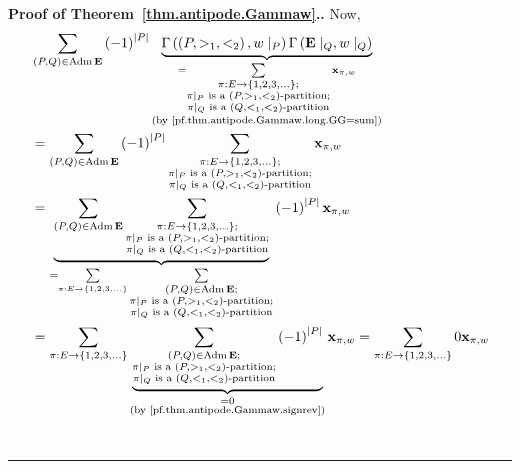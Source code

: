 \documentclass[numbers=enddot,12pt,final,onecolumn,notitlepage,abstracton]{scrartcl}
\theoremstyle{definition}
\newenvironment{proof}[1][Proof]{\noindent\textbf{#1.} }{\ \rule{0.5em}{0.5em}}
\let\sumnonlimits\sum
\renewcommand{\sum}{\sumnonlimits\limits}
\newenvironment{verlong}{}{}
\newcommand{\xx}{{\mathbf{x}}}
\newcommand{\Adm}{\operatorname{Adm}}
\newcommand{\EE}{{\mathbf{E}}}
\begin{document}
\begin{proof}[Proof of Theorem~\ref{thm.antipode.Gammaw}.]
\begin{verlong}
Now,
\begin{align*}
& \sum_{\left(P, Q\right) \in \Adm \EE}
\left(-1\right)^{\left|P\right|}
\underbrace{\Gamma\left(\left(P, >_1, <_2\right), w\mid_P\right)
            \Gamma\left(\EE\mid_Q, w\mid_Q\right)}_{
 \substack{ = \sum_{\substack{\pi : E \to \left\{1, 2, 3, \ldots\right\}; \\
                \pi\mid_P \text{ is a }\left(P, >_1, <_2\right)\text{-partition;} \\
                \pi\mid_Q \text{ is a }\left(Q, <_1, <_2\right)\text{-partition}}}
              \xx_{\pi, w} \\
            \text{(by \eqref{pf.thm.antipode.Gammaw.long.GG=sum})}}}
\\
& = \sum_{\left(P, Q\right) \in \Adm \EE}
\left(-1\right)^{\left|P\right|}
\sum_{\substack{\pi : E \to \left\{1, 2, 3, \ldots\right\}; \\
                \pi\mid_P \text{ is a }\left(P, >_1, <_2\right)\text{-partition;} \\
                \pi\mid_Q \text{ is a }\left(Q, <_1, <_2\right)\text{-partition}}}
\xx_{\pi, w} \\
& =
\underbrace{\sum_{\left(P, Q\right) \in \Adm \EE}
\sum_{\substack{\pi : E \to \left\{1, 2, 3, \ldots\right\}; \\
                \pi\mid_P \text{ is a }\left(P, >_1, <_2\right)\text{-partition;} \\
                \pi\mid_Q \text{ is a }\left(Q, <_1, <_2\right)\text{-partition}}}
}_{ =
\sum_{\pi : E \to \left\{1, 2, 3, \ldots\right\}}
\sum_{\substack{\left(P, Q\right) \in \Adm \EE ; \\
                \pi\mid_P \text{ is a }\left(P, >_1, <_2\right)\text{-partition;} \\
                \pi\mid_Q \text{ is a }\left(Q, <_1, <_2\right)\text{-partition}}}
}
\left(-1\right)^{\left|P\right|}
\xx_{\pi, w} \\
& = \sum_{\pi : E \to \left\{1, 2, 3, \ldots\right\}}
\underbrace{
\sum_{\substack{\left(P, Q\right) \in \Adm \EE ; \\
                \pi\mid_P \text{ is a }\left(P, >_1, <_2\right)\text{-partition;} \\
                \pi\mid_Q \text{ is a }\left(Q, <_1, <_2\right)\text{-partition}}}
\left(-1\right)^{\left|P\right|}
}
_{\substack{=0 \\
            \text{(by \eqref{pf.thm.antipode.Gammaw.signrev})}}}
\xx_{\pi, w}
= \sum_{\pi : E \to \left\{1, 2, 3, \ldots\right\}} 0 \xx_{\pi, w}

\end{align*}
\end{verlong}
\end{proof}
\end{document}

